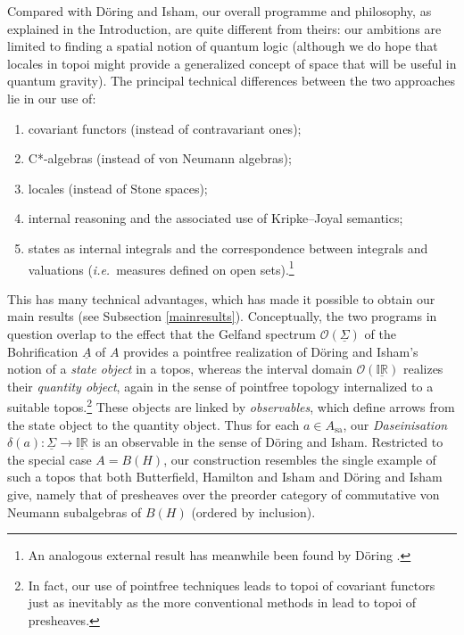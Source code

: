 \documentclass[12pt]{article}
\newcommand{\IR}{\mathbb{IR}}
\newcommand{\raw}{\rightarrow} \newcommand{\rat}{\mapsto}
\newcommand{\dl}{\delta} \newcommand{\Dl}{\Delta}
\newcommand{\CO}{{\mathcal O}} \newcommand{\CP}{{\mathcal P}}
\newcommand{\functor}[1]{\ensuremath{\underline{#1}}}
\newcommand{\sa}{\ensuremath{_{\mathrm{sa}}}}
\newcommand{\uA}{\underline{A}}
\newcommand{\ie}{\textit{i.e.}}
\newcommand{\ulS}{\functor{\Sigma}}
\begin{document}
Compared with D\"{o}ring and Isham,  our overall programme and philosophy, as explained in the Introduction, are quite different
from theirs:   our ambitions are limited to finding a spatial notion of quantum logic (although we do hope that locales in topoi might provide a generalized concept of space that will be useful in quantum gravity). The principal technical differences between the two approaches lie in
  our use of:
  \begin{enumerate}
  \item covariant functors (instead of contravariant ones);
\item  C*-algebras (instead of
von Neumann algebras);
\item
 locales (instead of Stone spaces);
\item  internal reasoning and the associated use of Kripke--Joyal semantics;
\item states as internal integrals and the correspondence between integrals and valuations (\ie\ measures defined on open sets).\footnote{An analogous external result has meanwhile been found by D\"{o}ring \cite{Doeringmeasure}.}
\end{enumerate}
 This has many technical advantages, which has made it possible to obtain our main results
(see Subsection \ref{mainresults}). 
Conceptually, the two programs in question overlap to the effect that the Gelfand spectrum
$\CO(\underline{\Sigma})$ of the Bohrification $\uA$ of $A$ provides a pointfree realization of 
D{\"o}ring and Isham's notion of a  \emph{state object} in a topos, whereas the  interval domain 
$\CO(\underline{\IR})$ realizes their \emph{quantity object}, again in the sense of  pointfree topology internalized to a suitable topos.\footnote{In fact, our use of pointfree techniques leads to topoi of covariant functors just as inevitably as the more conventional methods in
\cite{butterfieldisham1,butterfieldisham2, butterfieldisham3,doringisham1,doringisham2,doringisham3,doringisham4}
lead to topoi of presheaves.}
These objects are linked by {\it observables}, which define arrows from
the state object to the quantity object. Thus for each $a\in A\sa$, our  {\it Daseinisation} $\dl(a): \ulS\raw\underline{\IR}$ is an observable
in the sense of D\"{o}ring and Isham.  
Restricted to the special case $A=B(H)$, our construction resembles the single example
of such a topos that both  Butterfield, Hamilton and Isham \cite{butterfieldisham3} and D{\"o}ring and Isham \cite{doringisham2,doringisham3} give, namely that of presheaves over the preorder category of commutative von  Neumann subalgebras of $B(H)$ (ordered by inclusion).

{\small


}
\end{document}
